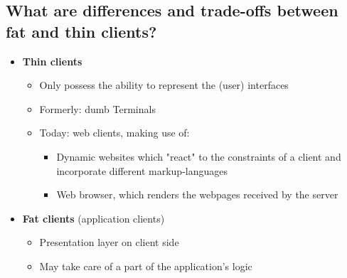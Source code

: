\documentclass{article}
\begin{document}
\subsection{What are differences and trade-offs between fat and thin clients?}
\begin{itemize}
    \item \textbf{Thin clients}
          \begin{itemize}
              \item Only possess the ability to represent the (user) interfaces
              \item Formerly: dumb Terminals
              \item Today: web clients, making use of:
                    \begin{itemize}
                        \item Dynamic websites which "react" to the constraints of a client and incorporate different markup-languages
                        \item Web browser, which renders the webpages received by the server
                    \end{itemize}
          \end{itemize}
    \item \textbf{Fat clients} (application clients)
          \begin{itemize}
              \item Presentation layer on client side
              \item May take care of a part of the application's logic
          \end{itemize}
\end{itemize}
\end{document}
